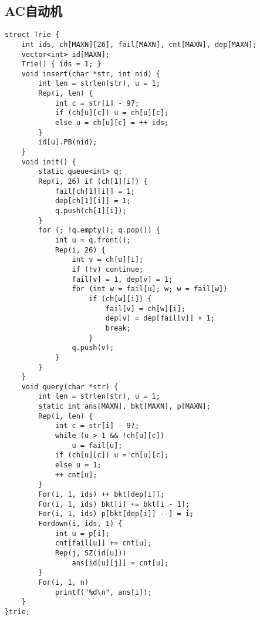 \documentclass[twocolumn,a4]{article}
\begin{document}
\subsection{AC自动机}
\begin{lstlisting}
struct Trie {
	int ids, ch[MAXN][26], fail[MAXN], cnt[MAXN], dep[MAXN];
	vector<int> id[MAXN];
	Trie() { ids = 1; }
	void insert(char *str, int nid) {
		int len = strlen(str), u = 1;
		Rep(i, len) {
			int c = str[i] - 97;
			if (ch[u][c]) u = ch[u][c];
			else u = ch[u][c] = ++ ids;
		}
		id[u].PB(nid);
	}
	void init() {
		static queue<int> q;
		Rep(i, 26) if (ch[1][i]) {
			fail[ch[1][i]] = 1;
			dep[ch[1][i]] = 1;
			q.push(ch[1][i]);
		}
		for (; !q.empty(); q.pop()) {
			int u = q.front();
			Rep(i, 26) {
				int v = ch[u][i];
				if (!v) continue;
				fail[v] = 1, dep[v] = 1;
				for (int w = fail[u]; w; w = fail[w])
					if (ch[w][i]) {
						fail[v] = ch[w][i];
						dep[v] = dep[fail[v]] + 1;
						break;
					}
				q.push(v);
			}
		}
	}
	void query(char *str) {
		int len = strlen(str), u = 1;
		static int ans[MAXN], bkt[MAXN], p[MAXN];
		Rep(i, len) {
			int c = str[i] - 97;
			while (u > 1 && !ch[u][c])
				u = fail[u];
			if (ch[u][c]) u = ch[u][c];
			else u = 1;
			++ cnt[u];
		}
		For(i, 1, ids) ++ bkt[dep[i]];
		For(i, 1, ids) bkt[i] += bkt[i - 1];
		For(i, 1, ids) p[bkt[dep[i]] --] = i;
		Fordown(i, ids, 1) {
			int u = p[i];
			cnt[fail[u]] += cnt[u];
			Rep(j, SZ(id[u]))
				ans[id[u][j]] = cnt[u];
		}
		For(i, 1, n)
			printf("%d\n", ans[i]);
	}
}trie;
\end{lstlisting}
\end{document}
